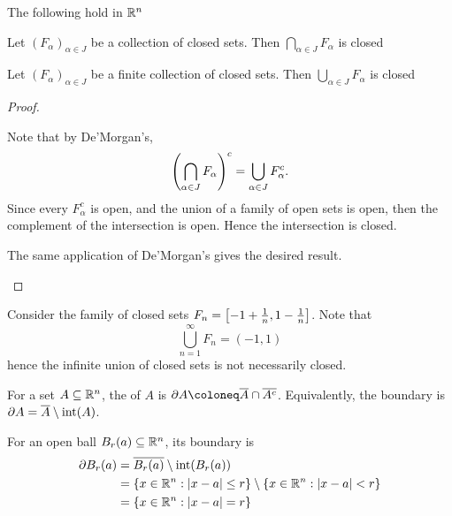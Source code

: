 \documentclass[../main.tex]{subfiles}
\begin{document}
\begin{theorem}
    The following hold in $\mathbb{R}^n$
    \begin{romanlist}
    \item Let $(F_{\alpha})_{\alpha \in J}$ be a collection of closed sets. Then $\bigcap_{\alpha \in J} F_{\alpha}$ is closed
    \item Let $(F_{\alpha})_{\alpha \in J}$ be a finite collection of closed sets. Then $\bigcup_{\alpha \in J} F_{\alpha}$ is closed
    \end{romanlist}
\end{theorem}

\begin{proof}
    \hfill
    \begin{romanlist}
        \item 
            Note that by De'Morgan's,
            \[
                \qty(\bigcap_{\alpha \in J} F_{\alpha})^c = \bigcup_{\alpha \in J} F_{\alpha}^c
            .\]
            Since every $F_{\alpha}^c$ is open, and the union of a family of open sets is open, then the complement of the intersection is open. Hence the intersection is closed.
        \item 
            The same application of De'Morgan's gives the desired result.
    \end{romanlist}
\end{proof}

\begin{remark}
    Consider the family of closed sets $F_n = \qty[-1 + \frac{1}{n}, 1  - \frac{1}{n}]$. Note that
    \[
        \bigcup_{n=1}^\infty F_n = (-1, 1)
    \]
    hence the infinite union of closed sets is not necessarily closed.
\end{remark}

\begin{definition}[Boundary]
    For a set $A \subseteq \mathbb{R}^n$, the  of $A$ is $\partial A \coloneq \conj{A} \cap \conj{A^c}$. Equivalently, the boundary is $\partial A = \overline{A} \setminus \operatorname{int}(A)$.
\end{definition}

\begin{example}
    For an open ball $B_r(a) \subseteq \mathbb{R}^n$, its boundary is
    \begin{align*}
        \partial B_r(a) &= \overline{B_r(a)} \setminus \operatorname{int}(B_r(a)) \\
                        &= \qty{x \in \mathbb{R}^n : |x-a| \leq r} \setminus \qty{x \in \mathbb{R}^n : |x-a| < r} \\
                        &= \qty{x \in \mathbb{R}^n : |x-a| = r}
    \end{align*}
\end{example}
\end{document}
